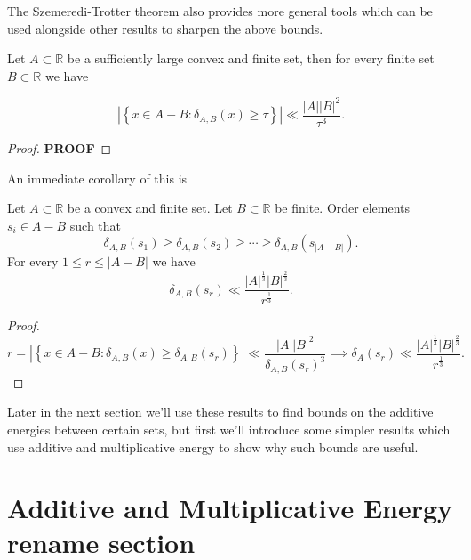 \documentclass[12pt]{amsart}
\begin{document}
The Szemeredi-Trotter theorem also provides more general tools which can be
used alongside other results to sharpen the above bounds.

\begin{theorem}

    Let \(A \subset \mathbb{R} \) be a sufficiently large convex and finite set, then for every 
    finite set \(B \subset \mathbb{R} \) we have

    \[
        \left\lvert \left\{ x \in A-B : \delta_{A,B} (x) \geq \tau \right\}  \right\rvert \ll \frac{\left\lvert A \right\rvert \left\lvert B \right\rvert^{2} }{\tau^{3} }
    .\]
\end{theorem}

\begin{proof}
\textbf{PROOF}
\end{proof}

An immediate corollary of this is

\begin{corollary}
Let \(A \subset \mathbb{R} \) be a convex and finite set. Let \(B \subset \mathbb{R} \) be finite.
Order elements \(s_{i} \in A-B\) such that 
\[
    \delta_{A,B} (s_1) \geq \delta_{A,B} (s_2) \geq \cdots \geq \delta_{A,B} (s _{\left\lvert A - B \right\rvert } )
.\]
For every \(1 \leq r \leq \left\lvert A - B \right\rvert\) we have
\[
    \delta_{A,B} (s _{r} ) \ll \frac{\left\lvert A \right\rvert^{\frac{1}{3} } \left\lvert B \right\rvert ^{\frac{2}{3} } }{r^{\frac{1}{3} }}
.\]
\end{corollary}

\begin{proof}
\[
    r = \left\lvert \left\{ x \in A-B : \delta _{A,B} (x) \geq \delta_{A,B} (s _{r} ) \right\}  \right\rvert \ll \frac{\left\lvert A \right\rvert \left\lvert B \right\rvert ^{2} }{\delta_{A,B} (s _{r} )^{3} } \implies \delta_{A} (s _{r} ) \ll \frac{\left\lvert A \right\rvert ^{\frac{1}{3} } \left\lvert B \right\rvert ^{\frac{2}{3} }}{r^{\frac{1}{3} }}
.\]
\end{proof}

Later in the next section we'll use these results to find bounds on the additive
energies between certain sets, but first we'll introduce some simpler results which
use additive and multiplicative energy to show why such bounds are useful.

\section{Additive and Multiplicative Energy \textbf{rename section}}
\end{document}
